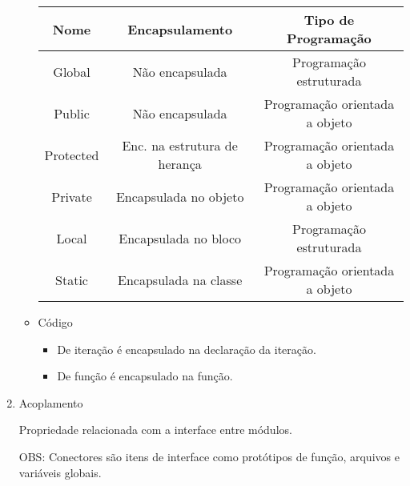 \documentclass[
	12pt, %
]{fphw}
\begin{document}
\begin{doublespace}
\begin{enumerate}
\begin{itemize}
                        \begin{center}
                            \begin{tabular}{  c c c }
                                \hline
                                Nome      & Encapsulamento               & Tipo de Programação            \\
                                \hline
                                Global    & Não encapsulada              & Programação estruturada        \\
                                Public    & Não encapsulada              & Programação orientada a objeto \\
                                Protected & Enc. na estrutura de herança & Programação orientada a objeto \\
                                Private   & Encapsulada no objeto        & Programação orientada a objeto \\
                                Local     & Encapsulada no bloco         & Programação estruturada        \\
                                Static    & Encapsulada na classe        & Programação orientada a objeto \\
                                \hline
                            \end{tabular}
                        \end{center}

                  \item Código

                        \begin{itemize}

                            \item De iteração é encapsulado na declaração da iteração.
                            \item De função é encapsulado na função.

                        \end{itemize}

              \end{itemize}

        \item Acoplamento
        
        Propriedade relacionada com a interface entre módulos.

        OBS: Conectores são itens de interface como protótipos de função, arquivos e variáveis globais.


\end{enumerate}
\end{doublespace}
\end{document}
